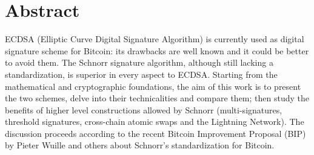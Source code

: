 \chapter{Abstract}
\label{chpr:abstract}
ECDSA (Elliptic Curve Digital Signature Algorithm) is currently used as digital signature scheme for Bitcoin: its drawbacks are well known and it could be better to avoid them. The Schnorr signature algorithm, although still lacking a standardization, is superior in every aspect to ECDSA. Starting from the mathematical and cryptographic foundations, the aim of this work is to present the two schemes, delve into their technicalities and compare them; then study the benefits of higher level constructions allowed by Schnorr (multi-signatures, threshold signatures, cross-chain atomic swaps and the Lightning Network). The discussion proceeds according to the recent Bitcoin Improvement Proposal (BIP) by Pieter Wuille and others about Schnorr's standardization for Bitcoin.
